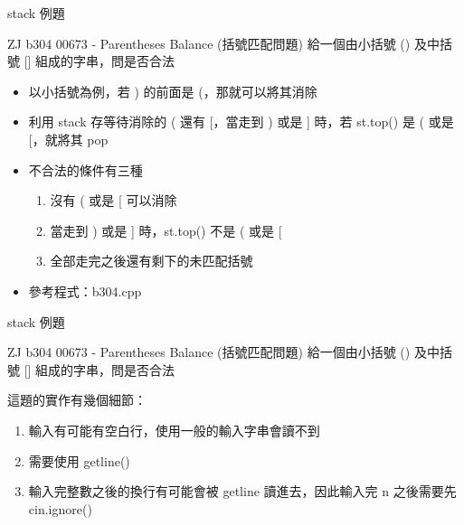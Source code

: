 \documentclass[aspectratio=169]{beamer}
\begin{document}
    \begin{frame}{stack 例題}
        \begin{block}{ZJ b304 00673 - Parentheses Balance (括號匹配問題)}
            給一個由小括號 () 及中括號 [] 組成的字串，問是否合法
        \end{block}

        \begin{itemize}
            \item<2-> 以小括號為例，若 ) 的前面是 (，那就可以將其消除
            \item<3-> 利用 stack 存等待消除的 ( 還有 [，當走到 ) 或是 ] 時，若 st.top() 是 ( 或是 [，就將其 pop
            \item<4-> 不合法的條件有三種
            \begin{enumerate}
                \item<5-> 沒有 ( 或是 [ 可以消除
                \item<6-> 當走到 ) 或是 ] 時，st.top() 不是 ( 或是 [
                \item<7-> 全部走完之後還有剩下的未匹配括號
            \end{enumerate}
            \item<8-> 參考程式：b304.cpp
        \end{itemize}
    \end{frame}

    \begin{frame}{stack 例題}
        \begin{block}{ZJ b304 00673 - Parentheses Balance (括號匹配問題)}
            給一個由小括號 () 及中括號 [] 組成的字串，問是否合法
        \end{block}

        這題的實作有幾個細節：
        \begin{enumerate}
            \item<1-> 輸入有可能有空白行，使用一般的輸入字串會讀不到
            \item<2-> 需要使用 getline()
            \item<3-> 輸入完整數之後的換行有可能會被 getline 讀進去，因此輸入完 n 之後需要先 cin.ignore()
        \end{enumerate}
    \end{frame}
\end{document}
